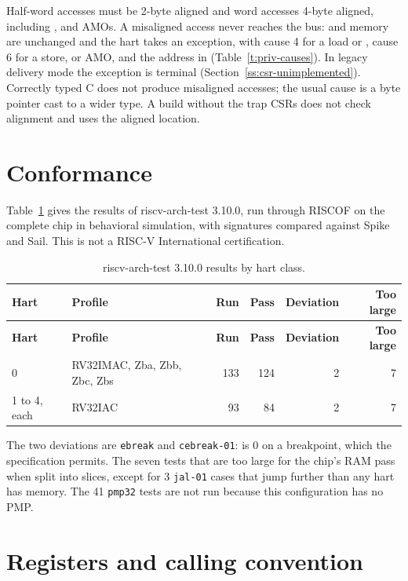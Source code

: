 \documentclass[11pt,pdftex,openany,letterpaper]{report}
\begin{document}
Half-word accesses must be 2-byte aligned and word accesses 4-byte aligned, including ,  and AMOs. A misaligned access never reaches the bus:  and memory are unchanged and the hart takes an exception, with cause 4 for a load or , cause 6 for a store,  or AMO, and the address in  (Table~\ref{t:priv-causes}). In legacy delivery mode the exception is terminal (Section~\ref{ss:csr-unimplemented}). Correctly typed C does not produce misaligned accesses; the usual cause is a byte pointer cast to a wider type. A build without the trap CSRs does not check alignment and uses the aligned location.

\ifnum{}
\section{Conformance} \label{ss:conformance}

Table~\ref{t:conformance} gives the results of riscv-arch-test 3.10.0, run through RISCOF on the complete chip in behavioral simulation, with signatures compared against Spike and Sail. This is not a RISC-V International certification.

\begin{longtable}[c]{ l l r r r r }
\caption{riscv-arch-test 3.10.0 results by hart class.} \label{t:conformance} \\
\hline \textbf{Hart} & \textbf{Profile} & \textbf{Run} & \textbf{Pass} & \textbf{Deviation} & \textbf{Too large} \\ \hline \endfirsthead
\hline \textbf{Hart} & \textbf{Profile} & \textbf{Run} & \textbf{Pass} & \textbf{Deviation} & \textbf{Too large} \\ \hline \endhead
                               0 & RV32IMAC, Zba, Zbb, Zbc, Zbs & 133 & 124 & 2 & 7 \\
\rowcolor{tablehighlightcolor} 1 to 4, each & RV32IAC & 93 & 84 & 2 & 7 \\
\hline
\end{longtable}

The two deviations are \texttt{ebreak} and \texttt{cebreak-01}:  is 0 on a breakpoint, which the specification permits. The seven tests that are too large for the chip's RAM pass when split into slices, except for 3 \texttt{jal-01} cases that jump further than any hart has memory. The 41 \texttt{pmp32} tests are not run because this configuration has no PMP.
\fi

\section{Registers and calling convention} \label{ss:abi}
\end{document}
